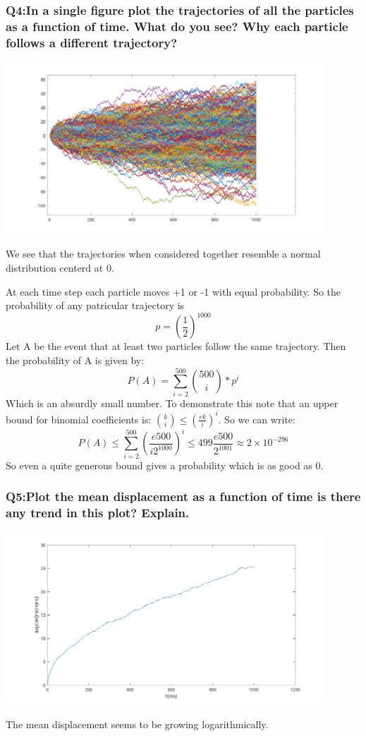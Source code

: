 \documentclass[12pt]{article}
\begin{document}
\subsubsection*{Q4:In a single figure plot the trajectories of all the particles as a function of time. What do you see? Why each particle follows a different trajectory?}
\includegraphics*[width=0.9\textwidth]{alltrajecs.png}

We see that the trajectories when considered together resemble a normal distribution centerd at 0.\vspace{3mm}

At each time step each particle moves +1 or -1 with equal probability. So the probability of any patricular trajectory is 
$$ p = (\frac{1}{2})^{1000}$$
Let A be the event that at least two particles follow the same trajectory. Then the probability of A is given by: 
$$ P(A) = \sum_{i=2}^{500}{500 \choose i}*p^i$$
Which is an absurdly small number. To demonstrate this note that an upper bound for binomial coefficients is: ${k \choose i} \leq (\frac{ek}{i})^i$. So we can write: 
$$ P(A) \leq  \sum_{i=2}^{500}{(\frac{e500}{i2^{1000}})^i} \leq  499 \frac{e500}{2^{1001}} \approx 2\times10^{-296} $$  
So even a quite generous bound gives a probability which is as good as 0. 

\subsubsection*{Q5:Plot the mean displacement as a function of time is there any trend in this plot? Explain. }
\includegraphics*[width=0.9\textwidth]{avgdev.png}

The mean displacement seems to be growing logarithmically.
\end{document}
